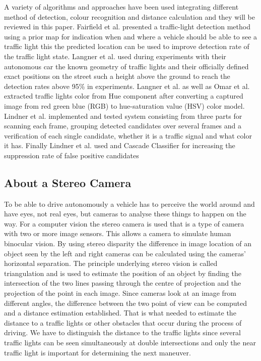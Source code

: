 \documentclass[letterpaper, 10 pt, conference]{ieeeconf} %
\begin{document}
A variety of algorithms and approaches have been used integrating different method of detection, colour recognition and distance calculation and they will be reviewed in this paper. Fairfield et al. \cite{c5} presented a traffic-light detection method using a prior map for indication when and where a vehicle should be able to see a traffic light this the predicted location can be used to improve detection rate of the traffic light state. Langner et al. \cite{c4} used during experiments with their autonomous car the known geometry of traffic lights and their officially defined exact positions on the street such a height above the ground to reach the detection rates above 95\% in experiments. Langner et al. as well as Omar et al. \cite{c4} extracted traffic lights color from Hue component after converting a captured image from red green blue (RGB) to hue-saturation value (HSV) color model. Lindner et al. \cite{c6} implemented and tested system consisting from three parts for scanning each frame, grouping detected candidates over several frames and a verification of each single candidate, whether it is a traffic signal and what color it has. Finally Lindner et al. used and Cascade Classifier for increasing the suppression rate of false positive candidates

\subsection{About a Stereo Camera}
To be able to drive autonomously a vehicle has to perceive the world around and have eyes, not real eyes, but cameras to analyse these things to happen on the way. For a computer vision the stereo camera is used that is a type of camera with two or more image sensors. This allows a camera to simulate human binocular vision. By using stereo disparity the difference in image location of an object seen by the left and right cameras can be calculated using the cameras' horizontal separation. The principle underlying stereo vision is called triangulation and is used to estimate the position of an object by finding the intersection of the two lines passing through the centre of projection and the projection of the point in each image. Since cameras look at an image from different angles, the difference between the two point of view can be computed and a distance estimation established. That is what needed to estimate the distance to a traffic lights or other obstacles that occur during the process of driving. We have to distinguish the distance to the traffic lights since several traffic lights can be seen simultaneously at double intersections and only the near traffic light is important for determining the next maneuver. 
\end{document}

